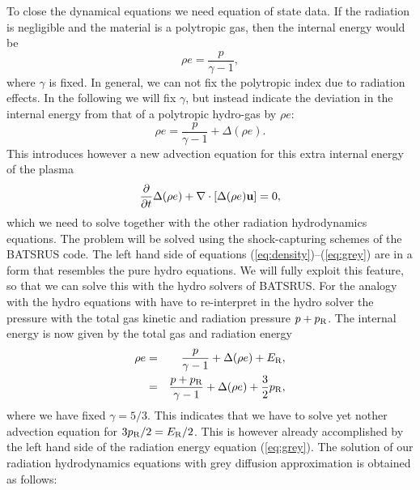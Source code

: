 \documentclass[12pt]{article}
\newcommand{\Erad}{E_{\rm R}}
\newcommand{\prad}{p_{\rm R}}
\begin{document}
To close the dynamical equations we need equation of state data. 
If the radiation is negligible and the material is a polytropic gas, 
then the internal energy would be 
\begin{equation} 
\rho e = \frac{p}{\gamma - 1}, 
\end{equation} 
where $\gamma$ is fixed. In general, we can not fix the polytropic index due 
to radiation effects. In the following we will fix $\gamma$, but instead  
indicate the deviation in the internal energy from that of a polytropic 
hydro-gas by $\rho e$: 
\begin{equation} 
\rho e = \frac{p}{\gamma - 1} + \Delta (\rho e). 
\end{equation} 
This introduces however a new advection equation for this extra internal 
energy of the plasma 
\begin{equation} 
\frac{\partial}{\partial t} \Delta(\rho e) + \nabla\cdot\left[  
\Delta(\rho e) {\bf u} \right] = 0, 
\end{equation} 
which we need to solve together with the other radiation hydrodynamics 
equations.  The problem will be solved using the shock-capturing schemes of 
the BATSRUS code. The left hand side of equations 
(\ref{eq:density})--(\ref{eq:grey}) are in a form that resembles the pure 
hydro equations. We will fully exploit this feature, so that we can solve 
this with the hydro solvers of BATSRUS. For the analogy with the hydro 
equations with have to re-interpret in the hydro solver the pressure with 
the total gas kinetic and radiation pressure $p+\prad$. The internal 
energy is now given by the total gas and radiation energy 
\begin{eqnarray} \rho e &=& \frac{p}{\gamma - 1} + \Delta (\rho e) + 
\Erad, \nonumber \\        
&=& \frac{p+\prad}{\gamma - 1} + \Delta (\rho e) + \frac{3}{2}\prad, 
\end{eqnarray} 
where we have fixed $\gamma=5/3$. This indicates that we have to solve yet 
nother advection equation for $3\prad/2=\Erad/2$. This is however 
already accomplished by the left hand side of the radiation energy equation 
(\ref{eq:grey}).  The solution of our radiation hydrodynamics equations with 
grey diffusion approximation is obtained as follows: 
\end{document}
